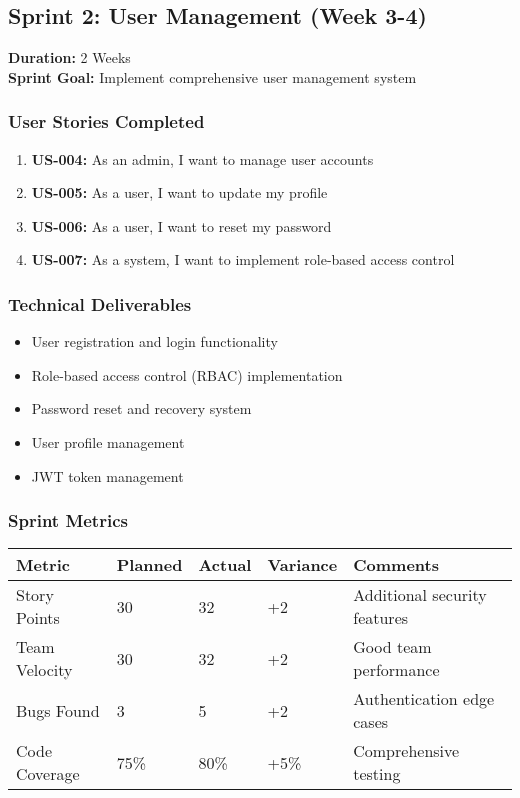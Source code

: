 \documentclass[12pt,a4paper]{article}
\begin{document}
\subsection{Sprint 2: User Management (Week 3-4)}
\textbf{Duration:} 2 Weeks \\
\textbf{Sprint Goal:} Implement comprehensive user management system

\subsubsection{User Stories Completed}
\begin{enumerate}
    \item \textbf{US-004:} As an admin, I want to manage user accounts
    \item \textbf{US-005:} As a user, I want to update my profile
    \item \textbf{US-006:} As a user, I want to reset my password
    \item \textbf{US-007:} As a system, I want to implement role-based access control
\end{enumerate}

\subsubsection{Technical Deliverables}
\begin{itemize}
    \item User registration and login functionality
    \item Role-based access control (RBAC) implementation
    \item Password reset and recovery system
    \item User profile management
    \item JWT token management
\end{itemize}

\subsubsection{Sprint Metrics}
\begin{longtable}{|p{4cm}|p{2cm}|p{2cm}|p{2cm}|p{4cm}|}
\hline
\textbf{Metric} & \textbf{Planned} & \textbf{Actual} & \textbf{Variance} & \textbf{Comments} \\
\hline
Story Points & 30 & 32 & +2 & Additional security features \\
\hline
Team Velocity & 30 & 32 & +2 & Good team performance \\
\hline
Bugs Found & 3 & 5 & +2 & Authentication edge cases \\
\hline
Code Coverage & 75\% & 80\% & +5\% & Comprehensive testing \\
\hline
\end{longtable}
\end{document}

